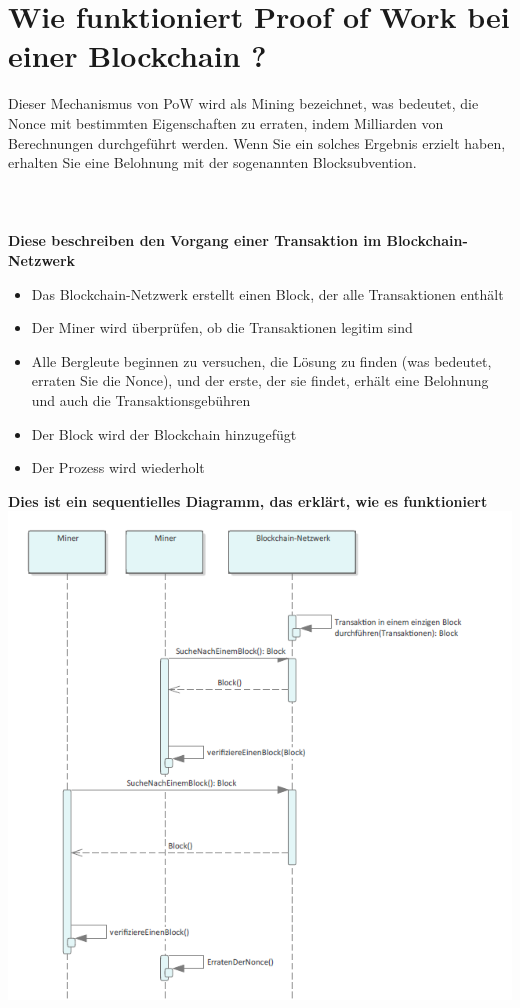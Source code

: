 \documentclass[ngerman]{scrreprt}
\begin{document}
\section{Wie funktioniert Proof of Work bei einer Blockchain ?}
Dieser Mechanismus von PoW wird als Mining bezeichnet, was bedeutet, die Nonce mit bestimmten Eigenschaften zu erraten, indem Milliarden von Berechnungen durchgeführt werden. Wenn Sie ein solches Ergebnis erzielt haben, erhalten Sie eine Belohnung mit der sogenannten Blocksubvention.\\ \\ \\ \\
\textbf{Diese beschreiben den Vorgang einer Transaktion im Blockchain-Netzwerk \\ }
\begin{itemize}
	\item{Das Blockchain-Netzwerk erstellt einen Block, der alle Transaktionen enthält}
	\item{Der Miner wird überprüfen, ob die Transaktionen legitim sind}
	\item{Alle Bergleute beginnen zu versuchen, die Lösung zu finden (was bedeutet, erraten Sie die Nonce), und der erste, der sie findet, erhält eine Belohnung und auch die Transaktionsgebühren}
	\item{Der Block wird der Blockchain hinzugefügt}
	\item{Der Prozess wird wiederholt \\}
	
\end{itemize}
\textbf{Dies ist ein sequentielles Diagramm, das erklärt, wie es funktioniert \\}
\includegraphics[width=\linewidth]{ProofOfWork1.png} \\ \\
\end{document}
